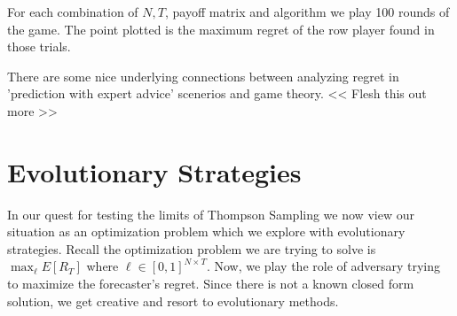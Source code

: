 \documentclass[10pt,a4paper]{article} %
\begin{document}
	For each combination of $N, T$, payoff matrix and algorithm we play 100 rounds of the game.  The point plotted is the maximum regret of the row player found in those trials.
	
	\begin{figure}[h!]
	\end{figure}

\pagebreak

There are some nice underlying connections between analyzing regret in 'prediction with expert advice' scenerios and game theory.    << Flesh this out more >>

	
	\pagebreak
	
	\section{Evolutionary Strategies}	
	
	In our quest for testing the limits of Thompson Sampling we now view our situation as an optimization problem which we explore with evolutionary strategies.  Recall the optimization problem we are trying to solve is $ \max_\ell E [R_T] $ where $\ell \in \left[ 0, 1 \right]^{N \times T} $.  Now, we play the role of adversary trying to maximize the forecaster's regret.  Since there is not a known closed form solution, we get creative and resort to evolutionary methods.
		
\end{document}
